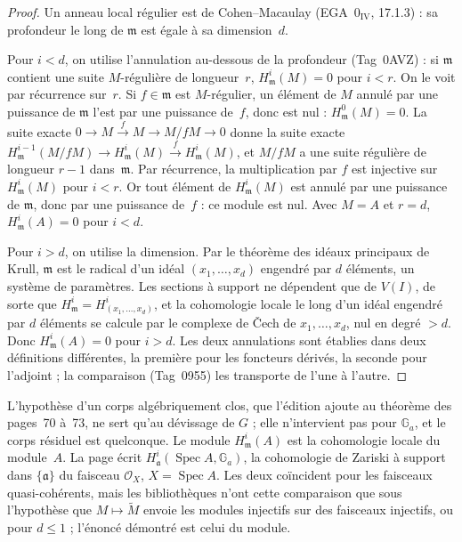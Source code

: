 \begin{proof}
Un anneau local régulier est de Cohen--Macaulay (EGA~$0_{\mathrm{IV}}$, 17.1.3) : sa profondeur le long de $\mathfrak m$ est égale à sa dimension~$d$.

Pour $i < d$, on utilise l'annulation au-dessous de la profondeur (Tag~0AVZ) : si $\mathfrak m$ contient une suite $M$-régulière de longueur~$r$, $H^i_{\mathfrak m}(M) = 0$ pour $i < r$. On le voit par récurrence sur~$r$. Si $f \in \mathfrak m$ est $M$-régulier, un élément de $M$ annulé par une puissance de $\mathfrak m$ l'est par une puissance de~$f$, donc est nul : $H^0_{\mathfrak m}(M) = 0$. La suite exacte $0 \to M \xrightarrow{f} M \to M/fM \to 0$ donne la suite exacte $H^{i-1}_{\mathfrak m}(M/fM) \to H^i_{\mathfrak m}(M) \xrightarrow{f} H^i_{\mathfrak m}(M)$, et $M/fM$ a une suite régulière de longueur $r - 1$ dans~$\mathfrak m$. Par récurrence, la multiplication par $f$ est injective sur $H^i_{\mathfrak m}(M)$ pour $i < r$. Or tout élément de $H^i_{\mathfrak m}(M)$ est annulé par une puissance de $\mathfrak m$, donc par une puissance de~$f$ : ce module est nul. Avec $M = A$ et $r = d$, $H^i_{\mathfrak m}(A) = 0$ pour $i < d$.

Pour $i > d$, on utilise la dimension. Par le théorème des idéaux principaux de Krull, $\mathfrak m$ est le radical d'un idéal $(x_1, \ldots, x_d)$ engendré par $d$ éléments, un système de paramètres. Les sections à support ne dépendent que de $V(I)$, de sorte que $H^i_{\mathfrak m} = H^i_{(x_1, \ldots, x_d)}$, et la cohomologie locale le long d'un idéal engendré par $d$ éléments se calcule par le complexe de Čech de $x_1, \ldots, x_d$, nul en degré $> d$. Donc $H^i_{\mathfrak m}(A) = 0$ pour $i > d$. Les deux annulations sont établies dans deux définitions différentes, la première pour les foncteurs dérivés, la seconde pour l'adjoint ; la comparaison (Tag~0955) les transporte de l'une à l'autre.
\end{proof}

\begin{remarque}
L'hypothèse d'un corps algébriquement clos, que l'édition ajoute au théorème des pages~70 à~73, ne sert qu'au dévissage de $G$ ; elle n'intervient pas pour $\mathbb G_a$, et le corps résiduel est quelconque. Le module $H^i_{\mathfrak m}(A)$ est la cohomologie locale du module~$A$. La page écrit $H^i_{\mathfrak a}(\operatorname{Spec} A, \mathbb G_a)$, la cohomologie de Zariski à support dans $\{\mathfrak a\}$ du faisceau $\mathcal O_X$, $X = \operatorname{Spec} A$. Les deux coïncident pour les faisceaux quasi-cohérents, mais les bibliothèques n'ont cette comparaison que sous l'hypothèse que $M \mapsto \widetilde M$ envoie les modules injectifs sur des faisceaux injectifs, ou pour $d \leq 1$ ; l'énoncé démontré est celui du module.
\end{remarque}

